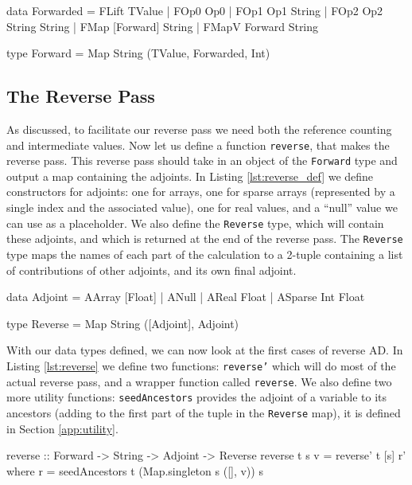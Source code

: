     \begin{haskell}[caption=Forward pass data structures, label=lst:forward, gobble=8]
        data Forwarded
            = FLift TValue
            | FOp0  Op0
            | FOp1  Op1       String
            | FOp2  Op2       String String
            | FMap  [Forward] String
            | FMapV Forward   String

        type Forward = Map String (TValue, Forwarded, Int)
    \end{haskell}

    \subsection{The Reverse Pass}
        As discussed, to facilitate our reverse pass we need both the reference counting and intermediate values.
        Now let us define a function \texttt{reverse}, that makes the reverse pass.
        This reverse pass should take in an object of the \texttt{Forward} type and output a map containing the adjoints.
        In Listing \ref{lst:reverse_def} we define constructors for adjoints: one for arrays, one for sparse arrays (represented by a single index and the associated value), one for real values, and a ``null'' value we can use as a placeholder.
        We also define the \texttt{Reverse} type, which will contain these adjoints, and which is returned at the end of the reverse pass.
        The \texttt{Reverse} type maps the names of each part of the calculation to a 2-tuple containing a list of contributions of other adjoints, and its own final adjoint.

        \begin{haskell}[caption=Definition of the \texttt{Reverse} type, label=lst:reverse_def, gobble=12]
            data Adjoint
                = AArray  [Float]
                | ANull
                | AReal   Float
                | ASparse Int Float

            type Reverse = Map String ([Adjoint], Adjoint)
        \end{haskell}

        With our data types defined, we can now look at the first cases of reverse AD.
        In Listing \ref{lst:reverse} we define two functions: \texttt{reverse'} which will do most of the actual reverse pass, and a wrapper function called \texttt{reverse}.
        We also define two more utility functions: \texttt{seedAncestors} provides the adjoint of a variable to its ancestors (adding to the first part of the tuple in the \texttt{Reverse} map), it is defined in Section \ref{app:utility}.

        \begin{haskell}[caption=Reverse pass function, label=lst:reverse, gobble=12]
            reverse :: Forward -> String -> Adjoint -> Reverse
            reverse t s v = reverse' t [s] r'
                where
                    r = seedAncestors t (Map.singleton s ([], v)) s
        \end{haskell}

